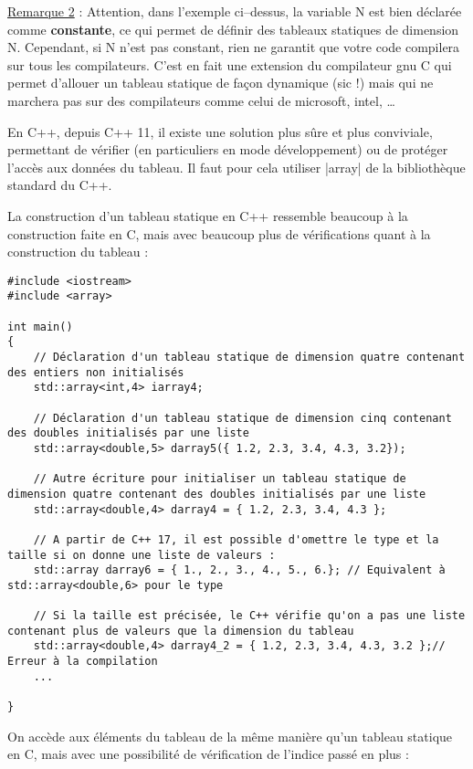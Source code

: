 \underline{Remarque 2} : Attention, dans l'exemple ci--dessus, la variable N est bien déclarée comme \textbf{constante}, ce qui permet de définir des tableaux statiques de dimension N. Cependant, si N n'est pas constant, rien ne garantit que votre code compilera sur tous les compilateurs. C'est en fait une extension du compilateur gnu C qui permet d'allouer un tableau statique de façon dynamique (sic !) mais qui ne marchera pas sur des compilateurs comme celui de microsoft, intel, \ldots

En C++, depuis C++ 11, il existe une solution plus sûre et plus conviviale, permettant de vérifier (en particuliers en mode développement) ou de protéger l'accès aux données du tableau. Il faut pour cela utiliser |array| de la bibliothèque standard du C++.

La construction d'un tableau statique en C++ ressemble beaucoup à la construction faite en C, mais avec beaucoup plus de vérifications quant à la construction du tableau :

\begin{lstlisting}
#include <iostream>
#include <array> 

int main()
{
    // Déclaration d'un tableau statique de dimension quatre contenant des entiers non initialisés
    std::array<int,4> iarray4;

    // Déclaration d'un tableau statique de dimension cinq contenant des doubles initialisés par une liste
    std::array<double,5> darray5({ 1.2, 2.3, 3.4, 4.3, 3.2});

    // Autre écriture pour initialiser un tableau statique de dimension quatre contenant des doubles initialisés par une liste
    std::array<double,4> darray4 = { 1.2, 2.3, 3.4, 4.3 };

    // A partir de C++ 17, il est possible d'omettre le type et la taille si on donne une liste de valeurs :
    std::array darray6 = { 1., 2., 3., 4., 5., 6.}; // Equivalent à std::array<double,6> pour le type

    // Si la taille est précisée, le C++ vérifie qu'on a pas une liste contenant plus de valeurs que la dimension du tableau
    std::array<double,4> darray4_2 = { 1.2, 2.3, 3.4, 4.3, 3.2 };// Erreur à la compilation 
    ...

}
\end{lstlisting}

On accède aux éléments du tableau de la même manière qu'un tableau statique en C, mais avec une possibilité de vérification de l'indice passé en plus :

